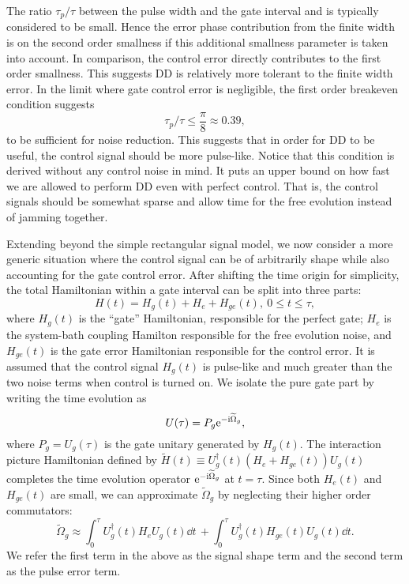 \documentclass[pra,reprint,superscriptaddress]{revtex4-2}
\newcommand{\wt}[1]{\widetilde{#1}}
\begin{document}
The ratio $\tau_p/\tau$ between the pulse width and the gate interval and is typically considered to be small. Hence the error phase contribution from the finite width is on the second order smallness if this additional smallness parameter is taken into account. In comparison,
the control error directly contributes to the first order smallness. 
This suggests DD is relatively more tolerant to the finite width error.
In the limit where gate control error is negligible, the first order breakeven condition suggests
\begin{equation}
 \tau_p/\tau \le \frac{\pi}{8}\approx 0.39,
\end{equation}
to be sufficient for noise reduction. 
This suggests that in order for DD to be useful, the control signal should be more pulse-like. Notice that this condition is derived without any control noise in mind. It puts an upper bound on how 
fast we are allowed to perform DD even with perfect control. That is, the 
control signals should be somewhat sparse and allow time for the free evolution instead of jamming together.


Extending beyond the simple rectangular signal model, we now consider a more generic situation where the control signal can be of arbitrarily shape while also accounting for the gate control error. After shifting the time origin for simplicity, the total Hamiltonian within a gate interval can be split into three parts:
\begin{equation}\label{eq:Hami-3parts}
 H(t)= H_g(t) +  H_e +  H_{ge}(t), \ 0\le t\le \tau,
\end{equation}
where $H_g(t)$ is the ``gate'' Hamiltonian, responsible for the perfect gate; 
$H_e$ is the system-bath coupling Hamilton responsible for the free evolution noise,
and $H_{ge}(t)$ is the gate error Hamiltonian responsible for the control error. It is assumed that the control signal $H_g(t)$ is pulse-like and much greater than the two noise terms when control is turned on.
We isolate the pure gate part by writing the time evolution as 
\begin{equation}
 U(\tau)=P_g \upe^{-\upi \wt \Omega_g},
\end{equation}
 where $P_g=U_g(\tau)$ is the gate unitary generated by $H_g(t)$.
The interaction picture Hamiltonian defined by
$\wt H(t)\equiv U_g^\dagger(t) (H_e + H_{ge} (t)) U_g(t)$ completes the time evolution operator $\upe^{-\upi \wt \Omega_g}$
at $t=\tau$. 
Since both $H_e(t)$ and $H_{ge}(t)$ are small, we can approximate $\wt \Omega_g$ by neglecting their higher order commutators:
\begin{equation}
 \wt \Omega_g \approx\! \int_0^\tau\!\! U_g^\dagger(t) H_e U_g(t) \dd t\, + \! \int_0^\tau\!\! U_g^\dagger(t) H_{ge}(t) U_g(t) \dd t.
\end{equation} 
We refer the first term in the above as the signal shape term and the second term as the pulse error term. 
\end{document}
